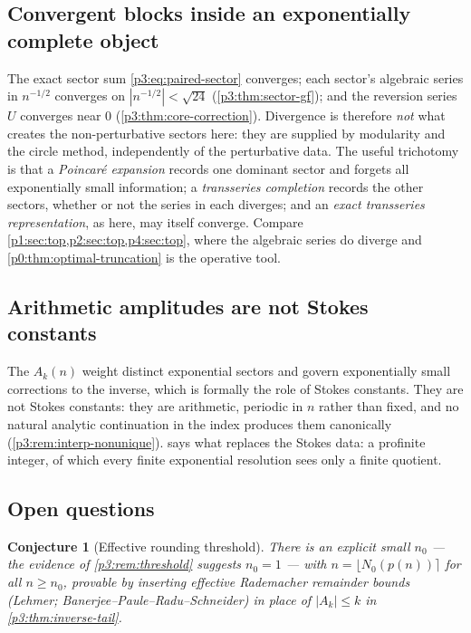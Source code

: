 \documentclass[11pt,a4paper,oneside]{book}
\theoremstyle{plain}
\newtheorem{conjecture}[theorem]{Conjecture}
\theoremstyle{definition}
\theoremstyle{remark}
\begin{document}
\subsection{Convergent blocks inside an exponentially complete object}

The exact sector sum \cref{p3:eq:paired-sector} converges; each sector's algebraic series in
$n^{-1/2}$ converges on $|n^{-1/2}|<\sqrt{24}$ (\cref{p3:thm:sector-gf}); and the reversion series
$U$ converges near $0$ (\cref{p3:thm:core-correction}). Divergence is therefore \emph{not} what
creates the non-perturbative sectors here: they are supplied by modularity and the circle method,
independently of the perturbative data. The useful trichotomy is that a \emph{Poincar\'e
expansion} records one dominant sector and forgets all exponentially small information; a
\emph{transseries completion} records the other sectors, whether or not the series in each
diverges; and an \emph{exact transseries representation}, as here, may itself converge. Compare
\cref{p1:sec:top,p2:sec:top,p4:sec:top}, where the algebraic series do diverge and
\cref{p0:thm:optimal-truncation} is the operative tool.

\subsection{Arithmetic amplitudes are not Stokes constants}

The $A_{k}(n)$ weight distinct exponential sectors and govern exponentially small corrections to
the inverse, which is formally the role of Stokes constants. They are not Stokes constants: they
are arithmetic, periodic in $n$ rather than fixed, and no natural analytic continuation in the
index produces them canonically (\cref{p3:rem:interp-nonunique}).  says
what replaces the Stokes data: a profinite integer, of which every finite exponential resolution
sees only a finite quotient.

\subsection{Open questions}

\begin{conjecture}[Effective rounding threshold]\label{p3:conj:effective-threshold}
There is an explicit small $n_{0}$ --- the evidence of \cref{p3:rem:threshold} suggests $n_{0}=1$
--- with $n=\lfloor N_{0}(p(n))\rceil$ for all $n\ge n_{0}$, provable by inserting effective
Rademacher remainder bounds (Lehmer; Banerjee--Paule--Radu--Schneider) in place of $|A_{k}|\le k$
in \cref{p3:thm:inverse-tail}.
\end{conjecture}
\end{document}
